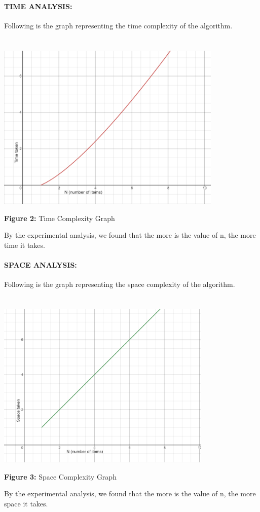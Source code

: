 \documentclass[10pt]{article}
\begin{document}
\begin{multicols*}{2}
\paragraph{TIME ANALYSIS:}Following is the graph representing the time complexity of the algorithm.\\\\\\
\includegraphics[width=\columnwidth, height=8cm]{Time Complexity.png}\begin{center}\textbf{Figure 2:} Time Complexity Graph\end{center}By the experimental analysis, we found that the more is the value of n, the more time it takes.

\paragraph{SPACE ANALYSIS:}Following is the graph representing the space complexity of the algorithm.\\\\\\
\includegraphics[width=\columnwidth, height=8cm]{Space Complexity.png}\begin{center}\textbf{Figure 3:} Space Complexity Graph\end{center}By the experimental analysis, we found that the more is the value of n, the more space it takes.


\end{multicols*}
\end{document}
